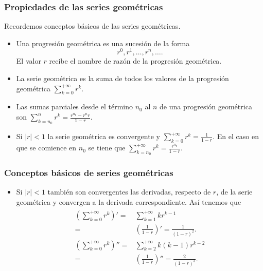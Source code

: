 \documentclass[handout]{beamer}\usepackage[]{graphicx}\usepackage[]{color}
\theoremstyle{plain}
\theoremstyle{definition}
\begin{document}
\begin{frame}


\frametitle{Propiedades de las series geométricas}
Recordemos conceptos básicos de las  series geométricas.
\begin{itemize}
\item Una progresión geométrica es una sucesión de la  forma  $$r^0, r^1,\ldots,r^n,\ldots.$$
El valor $r$ recibe el nombre de razón de la progresión geométrica. 
\item La serie geométrica es la suma de todos los
valores de la progresión geométrica $\displaystyle\sum_{k=0}^{+\infty} r^k$.
\item Las sumas parciales desde el término $n_0$ al $n$ de una progresión geométrica son
 $\sum_{k=n_0}^n r^k=\frac{r^{n_0}- r^n r}{1-r}.$

\item Si $|r|<1$ la serie geométrica es convergente y $\displaystyle\sum_{k=0}^{+\infty }
r^k=\frac{1}{1-r}$. En el caso en que se comience en $n_0$ se tiene que
$\displaystyle\sum_{k=n_0}^{+\infty} r^k=\frac{r^{n_0}}{1-r}$.
\end{itemize}

\end{frame}


\begin{frame}

\frametitle{Conceptos básicos de series geométricas}
\begin{itemize}
\item  Si $|r|<1$  también son convergentes las derivadas, respecto de $r$,
 de la serie geométrica y convergen a la derivada correspondiente. Así tenemos que
\begin{align*}
\begin{split}
\left(\sum_{k=0}^{+\infty} r^k\right)'= & \sum_{k=1}^{+\infty}k
r^{k-1}\\
=& \left(\frac{1}{1-r}\right)'=\frac{1}{(1-r)^2}.\\
\left(\sum_{k=0}^{+\infty} r^k\right)''=& \sum_{k=2}^{+\infty}k (k-1)
r^{k-2}\\ =&\left(\frac{1}{1-r}\right)''=\frac{2}{(1-r)^3}.
\end{split}
\end{align*}
\end{itemize}
\end{frame}
\end{document}
